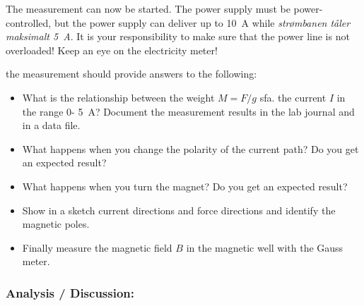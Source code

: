 \documentclass[../Elmag-labhefte-2020.tex]{subfiles}
\begin{document}
The measurement can now be started. The power supply must be power-controlled, but the power supply can deliver up to \SI{10}{\ampere} while \emph{strømbanen tåler maksimalt \SI{5}{\ampere}}. It is your responsibility to make sure that the power line is not overloaded! Keep an eye on the electricity meter!

the measurement should provide answers to the following:
\begin{itemize}
        \item What is the relationship between the weight $M  = F/g$ sfa. the current $I$ in the range 0- \SI{5}{\ampere}? Document the measurement results in the lab journal and in a data file.
        \item What happens when you change the polarity of the current path? Do you get an expected result?
    \item What happens when you turn the magnet? Do you get an expected result?
    \item Show in a sketch current directions and force directions and identify the magnetic poles.
    \item Finally measure the magnetic field $B$ in the magnetic well with the Gauss meter.
\end{itemize}

\subsubsection{Analysis / Discussion:}
\end{document}
